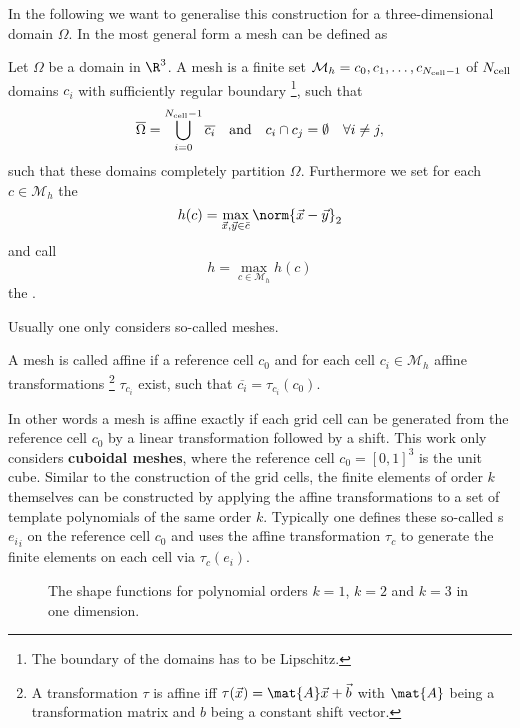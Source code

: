 In the following we want to generalise this construction
for a three-dimensional domain $\Omega$.
In the most general form a mesh can be defined as
\begin{defn}[Mesh]
	Let $\Omega$ be a domain in $\R^3$.
	A mesh is a finite set $\mathcal{M}_h = {c_0, c_1, \ldots, c_{N_\text{cell}-1}}$
	of $N_\text{cell}$ domains $c_i$ with sufficiently regular boundary%
	\footnote{The boundary of the domains has to be Lipschitz.},
	such that
	\begin{align*}
		\overline{\Omega} &= \bigcup_{i=0}^{N_\text{cell}-1} \overline{c_i}
		&&\text{and}
		&c_i \cap c_j = \emptyset \quad \forall i \neq j,
	\end{align*}
	\ie such that these domains completely partition $\Omega$.
	Furthermore we set for each $c \in \mathcal{M}_h$
	the 
	\[ h(c) = \max_{\vec{x},\vec{y} \in \bar{c}} \norm{\vec{x}-\vec{y}}_2 \]
	and call
	\[ h = \max_{c \in \mathcal{M}_h} h(c) \]
	the .
\end{defn}
\noindent
Usually one only considers so-called  meshes.
\begin{defn}
	A mesh is called affine if a reference cell $c_0$
	and for each cell $c_i \in \mathcal{M}_h$
	affine transformations%
	\footnote{A transformation $\tau$ is affine iff $\tau(\vec{x}) = \mat{A}\vec{x} + \vec{b}$ with $\mat{A}$ being a transformation matrix and $b$ being a constant shift vector.}
	$\tau_{c_i}$ exist,
	such that $\overline{c_i} = \tau_{c_i}(c_0)$.
\end{defn}
In other words a mesh is affine exactly if each
grid cell can be generated from the reference cell $c_0$
by a linear transformation followed by a shift.
This work only considers \textbf{cuboidal meshes},
where the reference cell $c_0 = [0,1]^3$ is the unit cube.
Similar to the construction of the grid cells,
the finite elements of order $k$ themselves
can be constructed by applying the affine transformations
to a set of template polynomials of the same order $k$.
Typically one defines these so-called
s ${e_i}_i$
on the reference cell $c_0$
and uses the affine transformation $\tau_c$
to generate the finite elements on each cell
via $\tau_c(e_i)$.
%
\begin{figure}
	\centering
	\caption[Examples for shape functions in one dimension]{
		The shape functions for polynomial orders $k=1$, $k=2$ and $k=3$
		in one dimension.
	}
	\label{fig:ShapeFunctionsOneD}
\end{figure}
